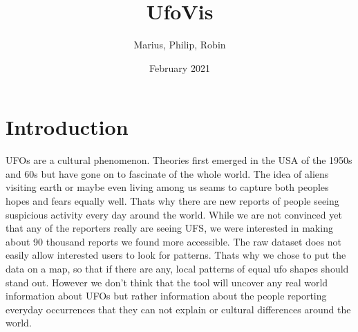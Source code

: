 \documentclass{article}
\title{UfoVis}
\author{Marius, Philip, Robin}
\date{February 2021}
\begin{document}
\maketitle


\section*{Introduction}
UFOs are a cultural phenomenon. Theories first emerged in the USA of the 1950s and 60s but have gone on to fascinate of the whole world. The idea of aliens visiting earth or maybe even living among us seams to capture both peoples hopes and fears equally well. Thats why there are new reports of people seeing suspicious activity every day around the world. While we are not convinced yet that any of the reporters really are seeing UFS, we were interested in making about 90 thousand reports we found more accessible. The raw dataset does not easily allow interested users to look for patterns. Thats why we chose to put the data on a map, so that if there are any, local patterns of equal ufo shapes should stand out. However we don't think that the tool will uncover any real world information about UFOs but rather information about the people reporting everyday occurrences that they can not explain or cultural differences around the world.
\end{document}
